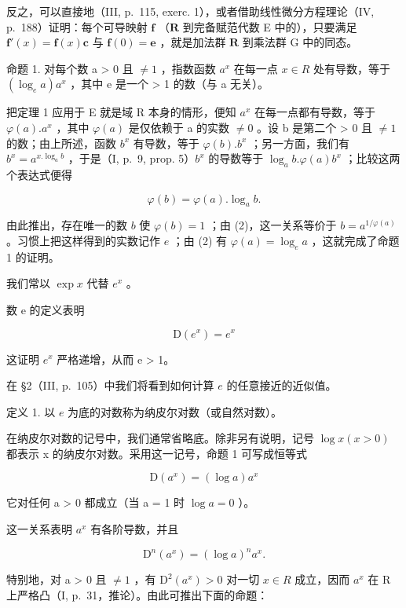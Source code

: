 反之，可以直接地（III, p.~115, exerc. 1），或者借助线性微分方程理论（IV, p.~188）证明：每个可导映射 \(\mathbf{f}\) （\(\mathbf{R}\) 到完备赋范代数 E 中的），只要满足 \(\mathbf{f}'(x) = \mathbf{f}(x)\mathbf{c}\) 与 \(\mathbf{f}(0) = \mathbf{e}\) ，就是加法群 \(\mathbf{R}\) 到乘法群 G 中的同态。

命题 1. 对每个数 a \textgreater{} 0 且 \(\neq 1\) ，指数函数 \(a^{x}\) 在每一点 \(x \in R\) 处有导数，等于 \((\log_{e}a)a^{x}\) ，其中 e 是一个 \textgreater{} 1 的数（与 a 无关）。

把定理 1 应用于 E 就是域 R 本身的情形，便知 \(a^{x}\) 在每一点都有导数，等于 \(\varphi(a).a^{x}\) ，其中 \(\varphi(a)\) 是仅依赖于 a 的实数 \(\neq 0\) 。设 b 是第二个 \textgreater{} 0 且 \(\neq 1\) 的数；由上所述，函数 \(b^{x}\) 有导数，等于 \(\varphi(b).b^{x}\) ；另一方面，我们有 \(b^{x} = a^{x.\log_{a}b}\) ，于是（I, p.~9, prop. 5）\(b^{x}\) 的导数等于 \(\log_{a}b.\varphi(a)b^{x}\) ；比较这两个表达式便得

\[
\varphi (b) = \varphi (a). \log_ {a} b.\tag{2}
\]

由此推出，存在唯一的数 \(b\) 使 \(\varphi(b) = 1\) ；由 (2)，这一关系等价于 \(b = a^{1/\varphi(a)}\) 。习惯上把这样得到的实数记作 \(e\) ；由 (2) 有 \(\varphi(a) = \log_e a\) ，这就完成了命题 1 的证明。

我们常以 \(\exp x\) 代替 \(e^x\) 。

数 e 的定义表明

\[
\mathrm{D} (e ^ {x}) = e ^ {x}\tag{3}
\]

这证明 \(e^{x}\) 严格递增，从而 e \textgreater{} 1。

在 §2（III, p.~105）中我们将看到如何计算 \(e\) 的任意接近的近似值。

定义 1. 以 \(e\) 为底的对数称为纳皮尔对数（或自然对数）。

在纳皮尔对数的记号中，我们通常省略底。除非另有说明，记号 \(\log x (x > 0)\) 都表示 x 的纳皮尔对数。采用这一记号，命题 1 可写成恒等式

\[
\mathrm{D} \left(a ^ {x}\right) = (\log a) a ^ {x}\tag{4}
\]

它对任何 a \textgreater{} 0 都成立（当 a = 1 时 \(\log a = 0\) ）。

这一关系表明 \(a^x\) 有各阶导数，并且

\[
\mathrm{D} ^ {n} \left(a ^ {x}\right) = (\log a) ^ {n} a ^ {x}.\tag{5}
\]

特别地，对 a \textgreater{} 0 且 \(\neq 1\) ，有 \(\mathrm{D}^{2}(a^{x}) > 0\) 对一切 \(x \in R\) 成立，因而 \(a^{x}\) 在 R 上严格凸（I, p.~31，推论）。由此可推出下面的命题：

